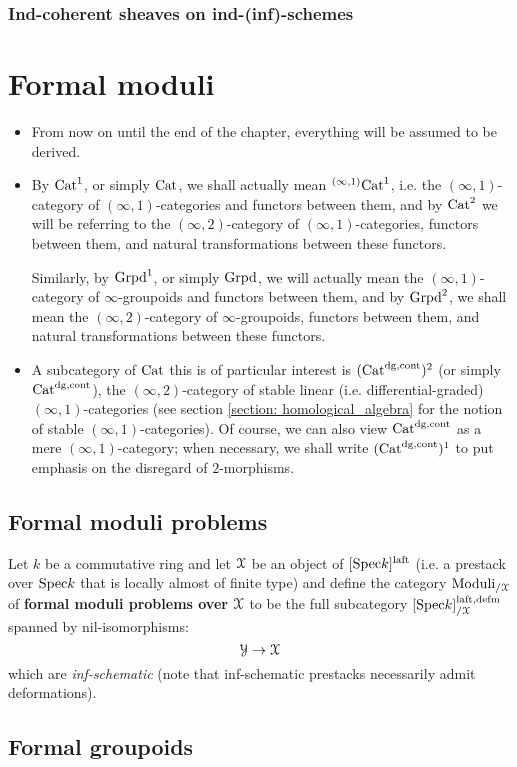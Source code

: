             \subsubsection{Ind-coherent sheaves on ind-(inf)-schemes}
        
    \section{Formal moduli}
        \begin{convention} \label{conv: moduli_everything_is_derived}
            \noindent
            \begin{itemize}
                \item From now on until the end of the chapter, everything will be assumed to be derived. 
                \item By $\mathrm{Cat}^1$, or simply $\mathrm{Cat}$, we shall actually mean ${}^{(\infty, 1)}\mathrm{Cat}^1$, i.e. the $(\infty, 1)$-category of $(\infty, 1)$-categories and functors between them, and by $\mathrm{Cat}^2$ we will be referring to the $(\infty, 2)$-category of $(\infty, 1)$-categories, functors between them, and natural transformations between these functors. 
                
                Similarly, by $\mathrm{Grpd}^1$, or simply $\mathrm{Grpd}$, we will actually mean the $(\infty, 1)$-category of $\infty$-groupoids and functors between them, and by $\mathrm{Grpd}^2$, we shall mean the $(\infty, 2)$-category of $\infty$-groupoids, functors between them, and natural transformations between these functors.
                \item A subcategory of $\mathrm{Cat}$ this is of particular interest is $(\mathrm{Cat}^{\mathrm{dg}, \mathrm{cont}})^2$ (or simply $\mathrm{Cat}^{\mathrm{dg}, \mathrm{cont}}$), the $(\infty, 2)$-category of stable linear (i.e. differential-graded) $(\infty, 1)$-categories (see section \ref{section: homological_algebra} for the notion of stable $(\infty, 1)$-categories). Of course, we can also view $\mathrm{Cat}^{\mathrm{dg}, \mathrm{cont}}$ as a mere $(\infty, 1)$-category; when necessary, we shall write $(\mathrm{Cat}^{\mathrm{dg}, \mathrm{cont}})^1$ to put emphasis on the disregard of $2$-morphisms.
            \end{itemize} 
        \end{convention}
    
        \subsection{Formal moduli problems}
            \begin{definition} \label{def: formal_moduli_problems}
                Let $k$ be a commutative ring and let $\mathcal{X}$ be an object of $[\mathrm{Spec} k]^{\mathrm{laft}}$ (i.e. a prestack over $\mathrm{Spec} k$ that is locally almost of finite type) and define the category $\mathrm{Moduli}_{/\mathcal{X}}$ of \textbf{formal moduli problems over $\mathcal{X}$} to be the full subcategory $[\mathrm{Spec} k]^{\mathrm{laft}, \mathrm{defm}}_{/\mathcal{X}}$ spanned by nil-isomorphisms:
                    $$\mathcal{Y} \to \mathcal{X}$$
                which are \textit{inf-schematic} (note that inf-schematic prestacks necessarily admit deformations).
            \end{definition}
        
        \subsection{Formal groupoids}